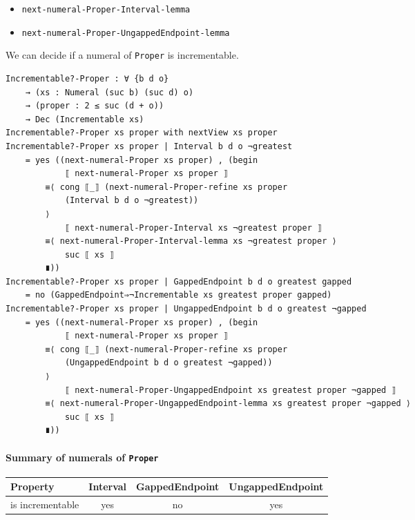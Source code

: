 \documentclass[\main/thesis.tex]{subfiles}
\begin{document}
\begin{itemize}
    \item \lstinline|next-numeral-Proper-Interval-lemma|
    \item \lstinline|next-numeral-Proper-UngappedEndpoint-lemma|
\end{itemize}

We can decide if a numeral of \lstinline|Proper| is incrementable.

\begin{lstlisting}[basicstyle=\ttfamily\scriptsize]
Incrementable?-Proper : ∀ {b d o}
    → (xs : Numeral (suc b) (suc d) o)
    → (proper : 2 ≤ suc (d + o))
    → Dec (Incrementable xs)
Incrementable?-Proper xs proper with nextView xs proper
Incrementable?-Proper xs proper | Interval b d o ¬greatest
    = yes ((next-numeral-Proper xs proper) , (begin
            ⟦ next-numeral-Proper xs proper ⟧
        ≡⟨ cong ⟦_⟧ (next-numeral-Proper-refine xs proper
            (Interval b d o ¬greatest))
        ⟩
            ⟦ next-numeral-Proper-Interval xs ¬greatest proper ⟧
        ≡⟨ next-numeral-Proper-Interval-lemma xs ¬greatest proper ⟩
            suc ⟦ xs ⟧
        ∎))
Incrementable?-Proper xs proper | GappedEndpoint b d o greatest gapped
    = no (GappedEndpoint⇒¬Incrementable xs greatest proper gapped)
Incrementable?-Proper xs proper | UngappedEndpoint b d o greatest ¬gapped
    = yes ((next-numeral-Proper xs proper) , (begin
            ⟦ next-numeral-Proper xs proper ⟧
        ≡⟨ cong ⟦_⟧ (next-numeral-Proper-refine xs proper
            (UngappedEndpoint b d o greatest ¬gapped))
        ⟩
            ⟦ next-numeral-Proper-UngappedEndpoint xs greatest proper ¬gapped ⟧
        ≡⟨ next-numeral-Proper-UngappedEndpoint-lemma xs greatest proper ¬gapped ⟩
            suc ⟦ xs ⟧
        ∎))
\end{lstlisting}

\paragraph{Summary of numerals of \lstinline|Proper|}

\begin{center}
    \begin{adjustbox}{max width=\textwidth}
    \begin{tabular}{ | l | c | c | c | }
    \textbf{Property} & \textbf{Interval} & \textbf{GappedEndpoint} & \textbf{UngappedEndpoint} \\
    \hline
    is incrementable     & yes & no & yes  \\
    \end{tabular}
    \end{adjustbox}
\end{center}
\end{document}
